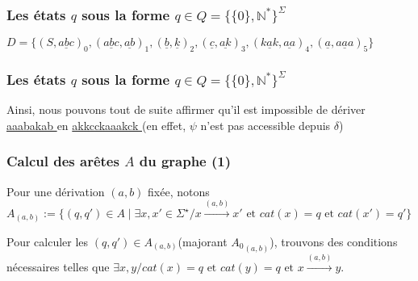 \documentclass[12pt]{beamer}
\begin{document}
\begin{frame}\frametitle{Les états $q$ sous la forme $q \in Q = \{\{0\},\mathbb{N}^*\}^{\Sigma}$}

$D = \{(S,\underline{ abc })_0,(\underline{ abc },\underline{ ab })_1,(\underline{ b },\underline{ k })_2,(\underline{ c },\underline{ ak })_3,(\underline{ kak },\underline{ aa })_4,(\underline{ a },\underline{ aaa })_5\}$

\begin{figure}
    \centering
    \qquad
\end{figure}

\end{frame}

\begin{frame}\frametitle{Les états $q$ sous la forme $q \in Q = \{\{0\},\mathbb{N}^*\}^{\Sigma}$}


Ainsi, nous pouvons tout de suite affirmer qu'il est impossible de dériver \underline{ aaabakab } en \underline{ akkcckaaakck } (en effet, $\psi$ n'est pas accessible depuis $\delta$)

\end{frame}

\begin{frame}\frametitle{Calcul des arêtes $A$ du graphe (1)}
Pour une dérivation $(a,b)$ fixée, notons\\
$A_{(a,b)} := \{(q,q') \in A \mid \exists x,x' \in \Sigma^\star / x \overset{(a,b)}{\rightarrow} x' \text{ et } cat(x) = q \text{ et } cat(x') = q'\}$

Pour calculer les $(q,q') \in A_{(a,b)}$(majorant ${A_0}_{(a,b)}$), trouvons des conditions nécessaires telles que $\exists x,y / cat(x) = q \text{ et } cat(y) = q \text { et } x \overset{(a,b)}{\rightarrow} y$.
\end{frame}
\end{document}
